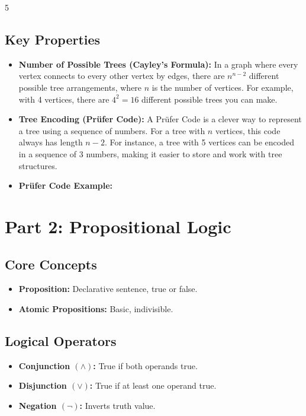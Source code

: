 \documentclass[a4paper,landscape]{article}
\begin{document}
\begin{multicols*}{5}
\subsection*{Key Properties}
\begin{itemize}[leftmargin=*, itemsep=0pt]
    \item \textbf{Number of Possible Trees (Cayley's Formula):} In a graph where every vertex connects to every other vertex by edges, there are $n^{n-2}$ different possible tree arrangements, where $n$ is the number of vertices. For example, with 4 vertices, there are $4^2 = 16$ different possible trees you can make.
    \item \textbf{Tree Encoding (Prüfer Code):} A Prüfer Code is a clever way to represent a tree using a sequence of numbers. For a tree with $n$ vertices, this code always has length $n-2$. For instance, a tree with 5 vertices can be encoded in a sequence of 3 numbers, making it easier to store and work with tree structures.
    \item \textbf{Prüfer Code Example:}
    \vspace*{5cm}
\end{itemize}


\section*{Part 2: Propositional Logic}

\subsection*{Core Concepts}
\begin{itemize}[leftmargin=*, itemsep=0pt]
    \item \textbf{Proposition:} Declarative sentence, true or false.
    \item \textbf{Atomic Propositions:} Basic, indivisible.
\end{itemize}

\subsection*{Logical Operators}
\begin{itemize}[leftmargin=*, itemsep=0pt]
    \item \textbf{Conjunction $(\wedge)$:} True if both operands true.
    \item \textbf{Disjunction $(\vee)$:} True if at least one operand true.
    \item \textbf{Negation $(\neg)$:} Inverts truth value.
\end{itemize}


\end{multicols*}
\end{document}
